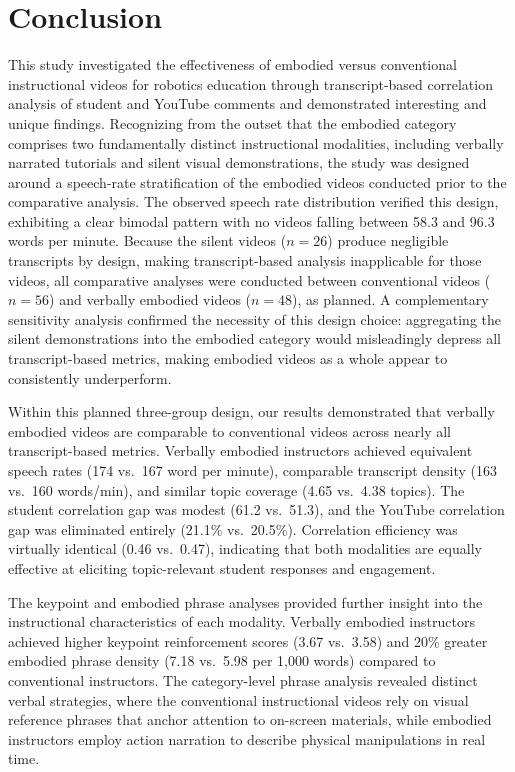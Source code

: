 \section{Conclusion}

This study investigated the effectiveness of embodied versus conventional instructional videos for robotics education through transcript-based correlation analysis of student and YouTube comments and demonstrated interesting and unique findings. Recognizing from the outset that the embodied category comprises two fundamentally distinct instructional modalities, including verbally narrated tutorials and silent visual demonstrations, the study was designed around a speech-rate stratification of the embodied videos conducted prior to the comparative analysis. The observed speech rate distribution verified this design, exhibiting a clear bimodal pattern with no videos falling between 58.3 and 96.3 words per minute. Because the silent videos ($n = 26$) produce negligible transcripts by design, making transcript-based analysis inapplicable for those videos, all comparative analyses were conducted between conventional videos ($n = 56$) and verbally embodied videos ($n = 48$), as planned. A complementary sensitivity analysis confirmed the necessity of this design choice: aggregating the silent demonstrations into the embodied category would misleadingly depress all transcript-based metrics, making embodied videos as a whole appear to consistently underperform.

Within this planned three-group design, our results demonstrated that verbally embodied videos are comparable to conventional videos across nearly all transcript-based metrics. Verbally embodied instructors achieved equivalent speech rates (174 vs.\ 167 word per minute), comparable transcript density (163 vs.\ 160 words/min), and similar topic coverage (4.65 vs.\ 4.38 topics). The student correlation gap was modest (61.2 vs.\ 51.3), and the YouTube correlation gap was eliminated entirely (21.1\% vs.\ 20.5\%). Correlation efficiency was virtually identical (0.46 vs.\ 0.47), indicating that both modalities are equally effective at eliciting topic-relevant student responses and engagement.

The keypoint and embodied phrase analyses provided further insight into the instructional characteristics of each modality. Verbally embodied instructors achieved higher keypoint reinforcement scores (3.67 vs.\ 3.58) and 20\% greater embodied phrase density (7.18 vs.\ 5.98 per 1{,}000 words) compared to conventional instructors. The category-level phrase analysis revealed distinct verbal strategies, where the conventional instructional videos rely on visual reference phrases that anchor attention to on-screen materials, while embodied instructors employ action narration to describe physical manipulations in real time.

